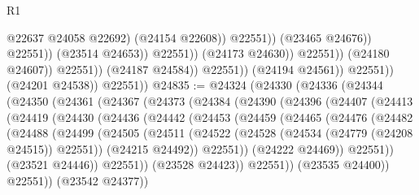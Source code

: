 \begin{lexlean}{R1}
\begin{coremodule}
                                                      @22637
                                                      @24058
                                                      @22692)
                                                    (@24154 @22608))
                                                  @22551))
                                              (@23465 @24676))
                                            @22551))
                                        (@23514 @24653))
                                      @22551))
                                  (@24173 @24630))
                                @22551))
                            (@24180 @24607))
                          @22551))
                      (@24187 @24584))
                    @22551))
                (@24194 @24561))
              @22551))
          (@24201 @24538))
        @22551))
@24835 := @24324
    (@24330
      (@24336
        (@24344
          (@24350
            (@24361
              (@24367
                (@24373
                  (@24384
                    (@24390
                      (@24396
                        (@24407
                          (@24413
                            (@24419
                              (@24430
                                (@24436
                                  (@24442
                                    (@24453
                                      (@24459
                                        (@24465
                                          (@24476
                                            (@24482
                                              (@24488
                                                (@24499
                                                  (@24505
                                                    (@24511
                                                      (@24522
                                                        (@24528
                                                          (@24534 (@24779 (@24208 @24515)) @22551))
                                                        (@24215 @24492))
                                                      @22551))
                                                  (@24222 @24469))
                                                @22551))
                                            (@23521 @24446))
                                          @22551))
                                      (@23528 @24423))
                                    @22551))
                                (@23535 @24400))
                              @22551))
                          (@23542 @24377))

\end{coremodule}
\end{lexlean}
